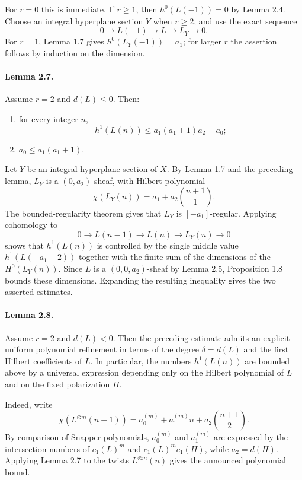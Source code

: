 \documentclass[12pt]{article}
\begin{document}
For $r=0$ this is immediate. If $r\geq1$, then $h^0(L(-1))=0$ by Lemma 2.4. Choose an integral hyperplane section $Y$ when $r\geq2$, and use the exact sequence
\[
0\to L(-1)\to L\to L_Y\to0.
\]
For $r=1$, Lemma 1.7 gives $h^0(L_Y(-1))=a_1$; for larger $r$ the assertion follows by induction on the dimension.


\paragraph{Lemma 2.7.}
Assume $r=2$ and $d(L)\leq0$. Then:
\begin{enumerate}[label=\roman*)]
\item for every integer $n$,
\[
h^1(L(n))\leq a_1(a_1+1)a_2-a_0;
\]
\item $a_0\leq a_1(a_1+1)$.
\end{enumerate}

Let $Y$ be an integral hyperplane section of $X$. By Lemma 1.7 and the preceding lemma, $L_Y$ is a $(0,a_2)$-sheaf, with Hilbert polynomial
\[
\chi(L_Y(n))=a_1+a_2\binom{n+1}{1}.
\]
The bounded-regularity theorem gives that $L_Y$ is $[-a_1]$-regular. Applying cohomology to
\[
0\to L(n-1)\to L(n)\to L_Y(n)\to0
\]
shows that $h^1(L(n))$ is controlled by the single middle value $h^1(L(-a_1-2))$ together with the finite sum of the dimensions of the $H^0(L_Y(n))$. Since $L$ is a $(0,0,a_2)$-sheaf by Lemma 2.5, Proposition 1.8 bounds these dimensions. Expanding the resulting inequality gives the two asserted estimates.

\paragraph{Lemma 2.8.}
Assume $r=2$ and $d(L)<0$. Then the preceding estimate admits an explicit uniform polynomial refinement in terms of the degree $\delta=d(L)$ and the first Hilbert coefficients of $L$. In particular, the numbers $h^1(L(n))$ are bounded above by a universal expression depending only on the Hilbert polynomial of $L$ and on the fixed polarization $H$.

Indeed, write
\[
\chi(L^{\otimes m}(n-1))=a_0^{(m)}+a_1^{(m)}n+a_2\binom{n+1}{2}.
\]
By comparison of Snapper polynomials, $a_0^{(m)}$ and $a_1^{(m)}$ are expressed by the intersection numbers of $c_1(L)^m$ and $c_1(L)^m c_1(H)$, while $a_2=d(H)$. Applying Lemma 2.7 to the twists $L^{\otimes m}(n)$ gives the announced polynomial bound.
\end{document}
